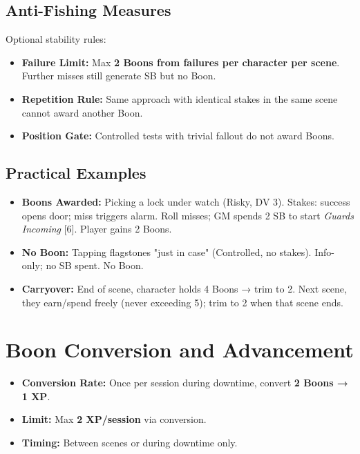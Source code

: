 \subsection{Anti-Fishing Measures}
\label{subsec:anti-fishing}
Optional stability rules:
\begin{itemize}
\item \textbf{Failure Limit:} Max \textbf{2 Boons from failures per character per scene}. Further misses still generate SB but no Boon.
\item \textbf{Repetition Rule:} Same approach with identical stakes in the same scene cannot award another Boon.
\item \textbf{Position Gate:} Controlled tests with trivial fallout do not award Boons.
\end{itemize}

\subsection{Practical Examples}
\label{subsec:boon-examples}
\begin{itemize}
\item \textbf{Boons Awarded:} Picking a lock under watch (Risky, DV 3). Stakes: success opens door; miss triggers alarm. Roll misses; GM spends 2 SB to start \emph{Guards Incoming} [6]. Player gains 2 Boons.
\item \textbf{No Boon:} Tapping flagstones "just in case" (Controlled, no stakes). Info-only; no SB spent. No Boon.
\item \textbf{Carryover:} End of scene, character holds 4 Boons → trim to 2. Next scene, they earn/spend freely (never exceeding 5); trim to 2 when that scene ends.
\end{itemize}

\section{Boon Conversion and Advancement}
\label{sec:boon-conversion}
\begin{itemize}
\item \textbf{Conversion Rate:} Once per session during downtime, convert \textbf{2 Boons → 1 XP}. 
\item \textbf{Limit:} Max \textbf{2 XP/session} via conversion. 
\item \textbf{Timing:} Between scenes or during downtime only. 
\end{itemize}

